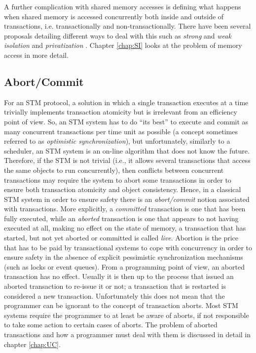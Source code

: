 A further complication with shared memory accesses is defining what happens when shared memory is accessed
concurrently both inside and outside
of transactions, i.e. transactionally and non-transactionally.
There have been several proposals detailing different ways to deal with this such as \emph{strong} and \emph{weak isolation} \cite{shpeis07}
and \emph{privatization} \cite{spear:privitization:podc:2007}.
Chapter \ref{chap:SI} looks at the problem of memory access in more detail.

\subsection{Abort/Commit}
For an STM protocol, a solution in which a single transaction  executes at a time
trivially implements transaction atomicity but is irrelevant from 
an efficiency point of view. So, an STM system has to do ``its best'' to 
execute and commit as many concurrent transactions  per time unit as possible
(a concept sometimes referred to as \emph{optimistic synchronization}), 
but unfortunately, similarly to 
a scheduler, an STM system is an on-line algorithm that does not know 
the future. Therefore, if the STM is not trivial (i.e., it allows several transactions 
that access the same objects to run concurrently),  
then conflicts between concurrent transactions may require the system to abort some transactions in order 
to ensure both transaction  atomicity and object consistency.
Hence,  in  a
classical  STM system  in order to ensure safety  there    is  an    {\it   abort/commit}    notion
associated   with transactions.
More explicitly, a \emph{committed} transaction is one that has been fully executed, while
an \emph{aborted} transaction is one that appears to not having executed at all, making no effect
on the state of memory, a transaction that has started, but not yet aborted or committed is called
\emph{live}.
Abortion is   the price that has to  be paid by transactional  systems to cope 
with concurrency in order to ensure safety in the absence of explicit pessimistic synchronization mechanisms
(such as locks or event queues).
From a programming point of view, an aborted transaction has no effect.
Usually it is then up to the process that issued an aborted transaction to re-issue it or not; 
a transaction that is restarted is considered  a new transaction. 
Unfortunately this does not mean that the programmer can be ignorant to the concept of transaction aborts.
Most STM systems require the programmer to at least be aware of aborts, if not responsible to take
some action to certain cases of aborts.
The problem of aborted transactions and how a programmer must deal with them is discussed in detail in chapter
\ref{chap:UC}.



